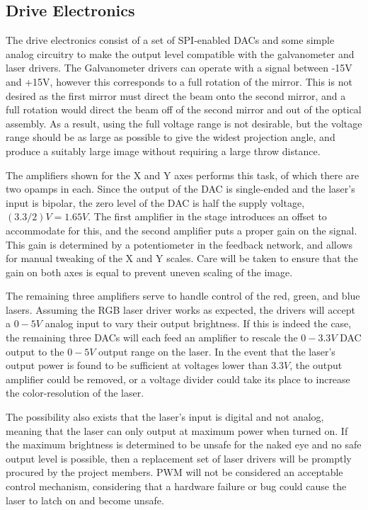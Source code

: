 \documentclass[11pt]{article}
\begin{document}
\subsection{Drive Electronics}
The drive electronics consist of a set of SPI-enabled DACs and some simple analog circuitry to make the output level compatible with the galvanometer and laser drivers. The Galvanometer drivers can operate with a signal between -15V and +15V, however this corresponds to a full rotation of the mirror. This is not desired as the first mirror must direct the beam onto the second mirror, and a full rotation would direct the beam off of the second mirror and out of the optical assembly. As a result, using the full voltage range is not desirable, but the voltage range should be as large as possible to give the widest projection angle, and produce a suitably large image without requiring a large throw distance. \newline

\noindent The amplifiers shown for the X and Y axes performs this task, of which there are two opamps in each. Since the output of the DAC is single-ended and the laser's input is bipolar, the zero level of the DAC is half the supply voltage, $(3.3/2) V = 1.65 V$. The first amplifier in the stage introduces an offset to accommodate for this, and the second amplifier puts a proper gain on the signal. This gain is determined by a potentiometer in the feedback network, and allows for manual tweaking of the X and Y scales. Care will be taken to ensure that the gain on both axes is equal to prevent uneven scaling of the image. \newline

\noindent The remaining three amplifiers serve to handle control of the red, green, and blue lasers. Assuming the RGB laser driver works as expected, the drivers will accept a $0-5V$ analog input to vary their output brightness. If this is indeed the case, the remaining three DACs will each feed an amplifier to rescale the $0-3.3V$ DAC output to the $0-5V$ output range on the laser. In the event that the laser's output power is found to be sufficient at voltages lower than $3.3V$, the output amplifier could be removed, or a voltage divider could take its place to increase the color-resolution of the laser.\newline

\noindent The possibility also exists that the laser's input is digital and not analog, meaning that the laser can only output at maximum power when turned on. If the maximum brightness is determined to be unsafe for the naked eye and no safe output level is possible, then a replacement set of laser drivers will be promptly procured by the project members. PWM will not be considered an acceptable control mechanism, considering that a hardware failure or bug could cause the laser to latch on and become unsafe.
\end{document}
